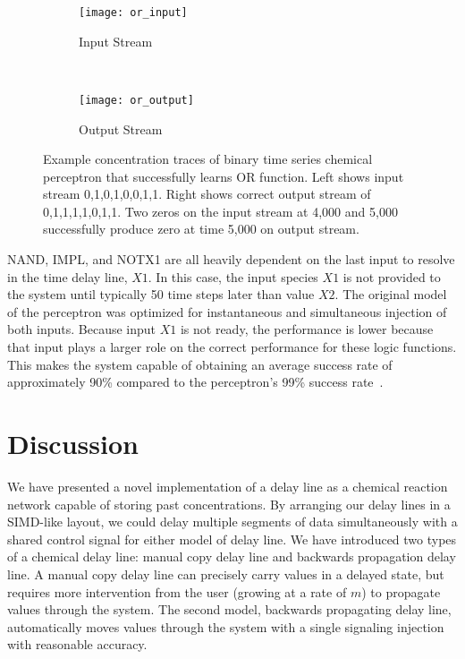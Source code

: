 \begin{figure}[p]
	\centering
	\begin{subfigure}[b]{0.9\textwidth}
	    \centering
		\texttt{[image: or\_input]}
		\caption{Input Stream}
		\label{fig:ORinput}
		\vspace{15mm}
	\end{subfigure}
	\\
	\begin{subfigure}[b]{0.9\textwidth}
	    \centering
		\texttt{[image: or\_output]}
		\caption{Output Stream}
		\label{fig:OROutput}
	\end{subfigure}
	\caption[Concentration Traces for Perceptron/Delay Line Learning Logic OR]{Example concentration traces of binary time series chemical perceptron that successfully learns OR function. Left shows input stream 0,1,0,1,0,0,1,1. Right shows correct output stream of 0,1,1,1,1,0,1,1. Two zeros on the input stream at 4,000 and 5,000 successfully produce zero at time 5,000 on output stream.}
	\label{fig:ORPerceptResults}
\end{figure}

NAND, IMPL, and NOTX1 are all heavily dependent on the last input to resolve in the time delay line, $X1$. In this case, the input species $X1$ is not provided to the system until typically 50 time steps later than value $X2$. The original model of the perceptron was optimized for instantaneous and simultaneous injection of both inputs. Because input $X1$ is not ready, the performance is lower because that input plays a larger role on the correct performance for these logic functions. This makes the system capable of obtaining an average success rate of approximately 90\% compared to the perceptron's 99\% success rate~\cite{Banda2014-bp}.

\section{Discussion}
We have presented a novel implementation of a delay line as a chemical reaction network capable of storing past concentrations. By arranging our delay lines in a SIMD-like layout, we could delay multiple segments of data simultaneously with a shared control signal for either model of delay line. We have introduced two types of a chemical delay line: manual copy delay line and backwards propagation delay line. A manual copy delay line can precisely carry values in a delayed state, but requires more intervention from the user (growing at a rate of $m$) to propagate values through the system. The second model, backwards propagating delay line, automatically moves values through the system with a single signaling injection with reasonable accuracy.


